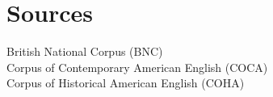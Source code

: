 ﻿\documentclass[output=paper]{langsci/langscibook}
\begin{document}
\section*{Sources}

British National Corpus (BNC)\\
Corpus of Contemporary American English (COCA)\\
Corpus of Historical American English (COHA)

{\sloppy\printbibliography[heading=subbibliography]}
\end{document}
